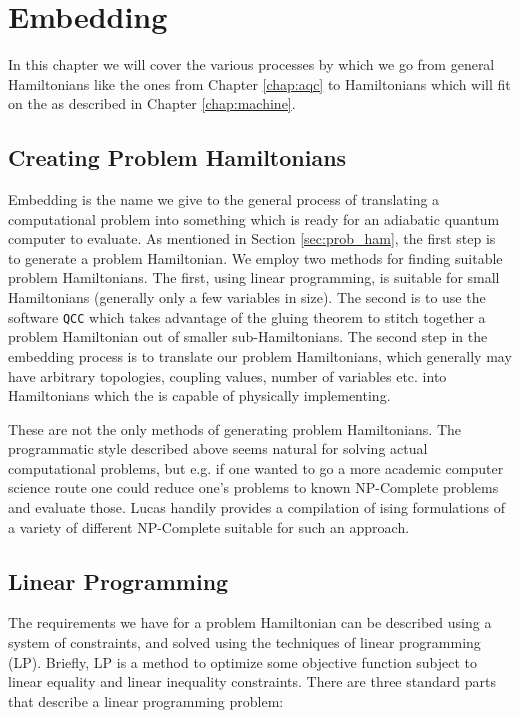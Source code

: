 \chapter{Embedding}
\label{chap:embed}
In this chapter we will cover the various processes by which we go from general Hamiltonians like the ones from Chapter \ref{chap:aqc} to Hamiltonians which will fit on the \machine as described in Chapter \ref{chap:machine}.

\section{Creating Problem Hamiltonians}
Embedding is the name we give to the general process of translating a computational problem into something which is ready for an adiabatic quantum computer to evaluate.  As mentioned in Section \ref{sec:prob_ham}, the first step is to generate a problem Hamiltonian.  We employ two methods for finding suitable problem Hamiltonians.  The first, using linear programming, is suitable for small Hamiltonians (generally only a few variables in size).  The second is to use the software \texttt{QCC} which takes advantage of the gluing theorem to stitch together a problem Hamiltonian out of smaller sub-Hamiltonians.
The second step in the embedding process is to translate our problem Hamiltonians, which generally may have arbitrary topologies, coupling values, number of variables etc. into Hamiltonians which the \machine is capable of physically implementing.

These are not the only methods of generating problem Hamiltonians.  The programmatic style described above seems natural for solving actual computational problems, but e.g. if one wanted to go a more academic computer science route one could reduce one's problems to known NP-Complete problems and evaluate those.  Lucas \cite{lucas} handily provides a compilation of ising formulations of a variety of different NP-Complete suitable for such an approach.

\section{Linear Programming}
\label{sec:lin_prog}
The requirements we have for a problem Hamiltonian can be described using a system of constraints, and solved using the techniques of linear programming (LP).
Briefly, LP is a method to optimize some objective function subject to linear equality and linear inequality constraints.  There are three standard parts that describe a linear programming problem:

